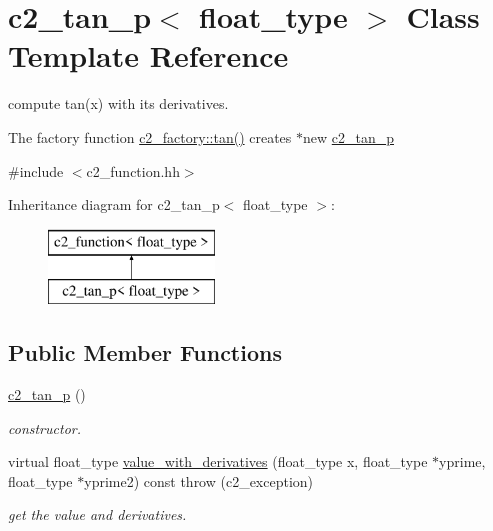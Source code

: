 \hypertarget{classc2__tan__p}{\section{c2\-\_\-tan\-\_\-p$<$ float\-\_\-type $>$ Class Template Reference}
\label{classc2__tan__p}
}


compute tan(x) with its derivatives.

The factory function \hyperlink{classc2__factory_a2f83cbd3be646166f7e3bef1e27244b9}{c2\-\_\-factory\-::tan()} creates $\ast$new \hyperlink{classc2__tan__p}{c2\-\_\-tan\-\_\-p}  




{\ttfamily \#include $<$c2\-\_\-function.\-hh$>$}

Inheritance diagram for c2\-\_\-tan\-\_\-p$<$ float\-\_\-type $>$\-:\begin{figure}[H]
\begin{center}
\leavevmode
\includegraphics[height=2.000000cm]{classc2__tan__p}
\end{center}
\end{figure}
\subsection*{Public Member Functions}
\begin{DoxyCompactItemize}
\item 
\hypertarget{classc2__tan__p_a164b52d522c474fb35ea61a50d80cf4c}{\hyperlink{classc2__tan__p_a164b52d522c474fb35ea61a50d80cf4c}{c2\-\_\-tan\-\_\-p} ()}\label{classc2__tan__p_a164b52d522c474fb35ea61a50d80cf4c}

\begin{DoxyCompactList}\small\item\em constructor. \end{DoxyCompactList}\item 
virtual float\-\_\-type \hyperlink{classc2__tan__p_ac1e6ff8fd74a4d33ce189297fd16bbee}{value\-\_\-with\-\_\-derivatives} (float\-\_\-type x, float\-\_\-type $\ast$yprime, float\-\_\-type $\ast$yprime2) const   throw (c2\-\_\-exception)
\begin{DoxyCompactList}\small\item\em get the value and derivatives. \end{DoxyCompactList}\end{DoxyCompactItemize}
